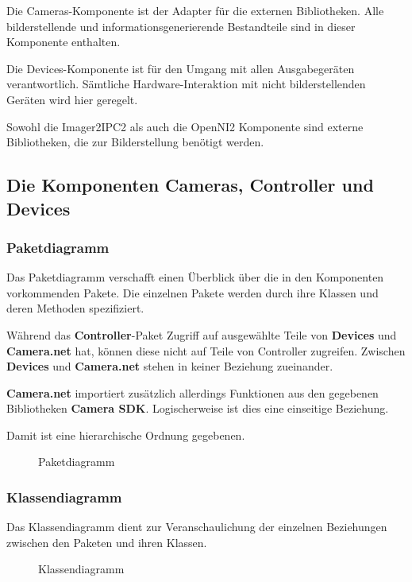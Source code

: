 Die Cameras-Komponente ist der Adapter für die externen Bibliotheken.
Alle bilderstellende und informationsgenerierende Bestandteile sind in dieser Komponente enthalten.

Die Devices-Komponente ist für den Umgang mit allen Ausgabegeräten verantwortlich.
Sämtliche Hardware-Interaktion mit nicht bilderstellenden Geräten wird hier geregelt.

Sowohl die Imager2IPC2 als auch die OpenNI2 Komponente sind externe Bibliotheken, die zur Bilderstellung benötigt werden.

\subsection{Die Komponenten Cameras, Controller und Devices}
\subsubsection{Paketdiagramm}
Das Paketdiagramm verschafft einen Überblick über die in den Komponenten vorkommenden Pakete.
Die einzelnen Pakete werden durch ihre Klassen und deren Methoden spezifiziert.

Während das \textbf{Controller}-Paket Zugriff auf ausgewählte Teile von \textbf{Devices} und \textbf{Camera.net} hat, können diese nicht auf Teile von Controller zugreifen.
Zwischen \textbf{Devices} und \textbf{Camera.net} stehen in keiner Beziehung zueinander.

\textbf{Camera.net} importiert zusätzlich allerdings Funktionen aus den gegebenen Bibliotheken \textbf{Camera SDK}.
Logischerweise ist dies eine einseitige Beziehung.

Damit ist eine hierarchische Ordnung gegebenen.
\begin{figure}[H]
	\centering
	\caption{Paketdiagramm}
	\label{fig:entwurf_paket}
\end{figure}

\subsubsection{Klassendiagramm}
Das Klassendiagramm dient zur Veranschaulichung der einzelnen Beziehungen zwischen den Paketen und ihren Klassen.
\begin{figure}[H]
	\centering
	\caption{Klassendiagramm}
	\label{fig:entwurf_class}
\end{figure}

